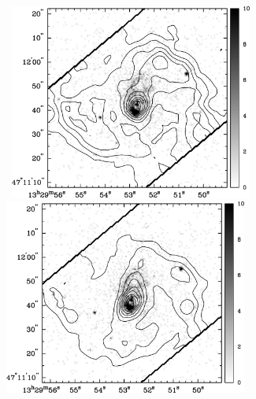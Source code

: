 \documentclass[manuscript]{aastex}
\begin{document}
\begin{figure}[!h]
\centerline{\hbox{ \hspace{0.0in} 
\includegraphics[width=8cm,angle=0]{bw_x_v_h2s2.jpg}
\hspace{0.1in}
\includegraphics[width=8cm,angle=0]{bw_x_v_h2s3.jpg}}}
\end{figure}
\end{document}
